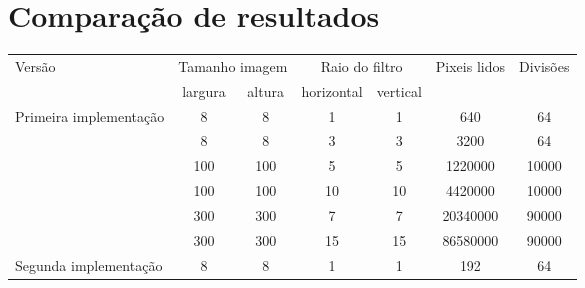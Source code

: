 \section{Comparação de resultados}

\begin{adjustbox}{center}
	\begin{tabular}{ |l||c|c||c|c||c|c|  }
		\hline
		\multirow{2}{*}{Versão}                 & \multicolumn{2}{c||}{Tamanho imagem} & \multicolumn{2}{c||}{Raio do filtro} & \multirow{2}{*}{Pixeis lidos} & \multirow{2}{*}{Divisões}                    \\
		\cline{2-5}
		                                        & largura                              & altura                               & horizontal                    & vertical                  &          &       \\
		\hline
		\multirow{6}{*}{Primeira implementação} & 8                                    & 8                                    & 1                             & 1                         & 640      & 64    \\
		\cline{2-7}
		                                        & 8                                    & 8                                    & 3                             & 3                         & 3200     & 64    \\
		\cline{2-7}
		                                        & 100                                  & 100                                  & 5                             & 5                         & 1220000  & 10000 \\
		\cline{2-7}
		                                        & 100                                  & 100                                  & 10                            & 10                        & 4420000  & 10000 \\
		\cline{2-7}
		                                        & 300                                  & 300                                  & 7                             & 7                         & 20340000 & 90000 \\
		\cline{2-7}
		                                        & 300                                  & 300                                  & 15                            & 15                        & 86580000 & 90000 \\
		\hline
		\multirow{6}{*}{Segunda implementação}  & 8                                    & 8                                    & 1                             & 1                         & 192      & 64    \\

\end{tabular}
\end{adjustbox}

